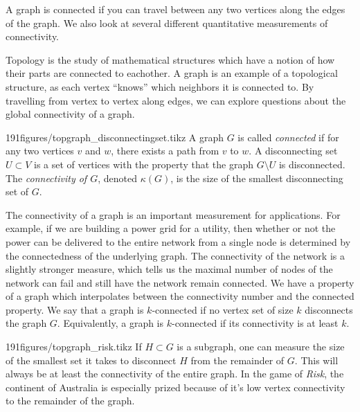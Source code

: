 \begin{elevator}[Connectivity]
	A graph is connected if you can travel between any two vertices along the edges of the graph. We also look at several different quantitative measurements of connectivity.
\end{elevator}
\label{sec:graph:connectivity}
Topology is the study of mathematical structures which have a notion of how their parts are connected to eachother.
A graph is an example of a topological structure, as each vertex ``knows'' which neighbors it is connected to. 
By travelling from vertex to vertex along edges, we can explore questions about the global connectivity of a graph.

\begin{definitionfigureenv}{191figures/topgraph_disconnectingset.tikz}
	A graph $G$ is called \emph{connected} if for any two vertices $v$ and $w$,  there exists a path from $v$ to $w$. 
	A disconnecting set $U\subset V$ is a set of vertices with the property that the graph $G\setminus U$ is disconnected.
	The \emph{connectivity of $G$}, denoted $\kappa(G)$, is the size of the smallest disconnecting set of $G$.  
\end{definitionfigureenv}

The connectivity of a graph is an important measurement for applications.
For example, if we are building a power grid for a utility, then whether or not the power can be delivered to the entire network from a single node is determined by the connectedness of the underlying graph. 
The connectivity of the network is a slightly stronger measure, which tells us the maximal number of nodes of the network can fail and still have the network remain connected.
We have a property of a graph which interpolates between the connectivity number and the connected property. We say that a graph is $k$-connected if no vertex set of size $k$ disconnects the graph $G$.
Equivalently, a graph is $k$-connected if its connectivity is at least $k$. 

%	


\begin{examplefigureenv}{191figures/topgraph_risk.tikz}
	If $H\subset G$ is a subgraph, one can measure the size of the smallest set it takes to disconnect $H$ from the remainder of $G$.
	This will always be at least the connectivity of the entire graph.
	In the game of \emph{Risk}, the continent of Australia is especially prized because of it's low vertex connectivity to the remainder of the graph. 
\end{examplefigureenv}

